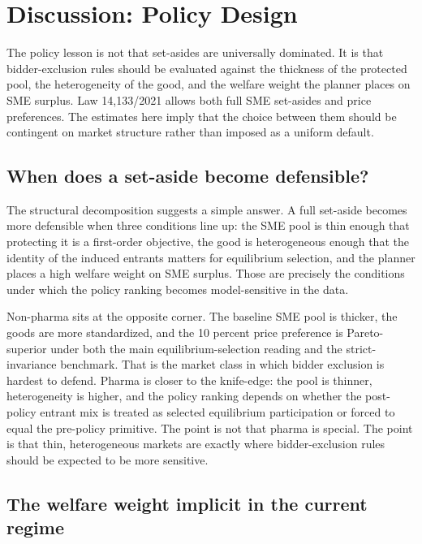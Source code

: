 \section{Discussion: Policy Design}\label{sec:discussion}

The policy lesson is not that set-asides are universally dominated. It is that bidder-exclusion rules should be evaluated against the thickness of the protected pool, the heterogeneity of the good, and the welfare weight the planner places on SME surplus. Law 14{,}133/2021 allows both full SME set-asides and price preferences. The estimates here imply that the choice between them should be contingent on market structure rather than imposed as a uniform default.

\subsection{When does a set-aside become defensible?}

The structural decomposition suggests a simple answer. A full set-aside becomes more defensible when three conditions line up: the SME pool is thin enough that protecting it is a first-order objective, the good is heterogeneous enough that the identity of the induced entrants matters for equilibrium selection, and the planner places a high welfare weight on SME surplus. Those are precisely the conditions under which the policy ranking becomes model-sensitive in the data.

Non-pharma sits at the opposite corner. The baseline SME pool is thicker, the goods are more standardized, and the 10 percent price preference is Pareto-superior under both the main equilibrium-selection reading and the strict-invariance benchmark. That is the market class in which bidder exclusion is hardest to defend. Pharma is closer to the knife-edge: the pool is thinner, heterogeneity is higher, and the policy ranking depends on whether the post-policy entrant mix is treated as selected equilibrium participation or forced to equal the pre-policy primitive. The point is not that pharma is special. The point is that thin, heterogeneous markets are exactly where bidder-exclusion rules should be expected to be more sensitive.

\subsection{The welfare weight implicit in the current regime}

